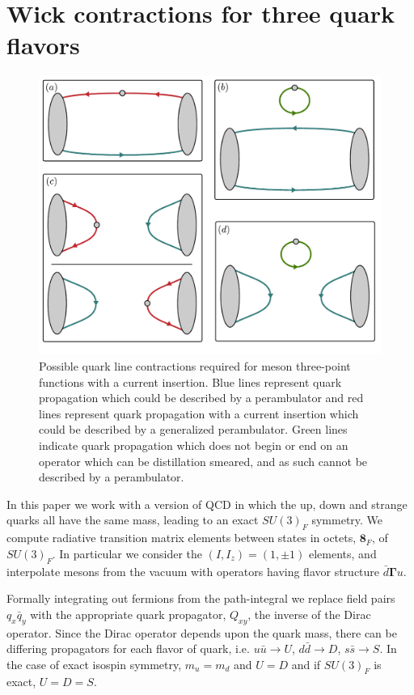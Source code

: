 \documentclass[twocolumn,amsmath,amssymb,prd,10pt,floatfix, 
superscriptaddress,nofootinbib, showpacs, preprintnumbers]{revtex4-1}
\begin{document}
\section{Wick contractions for three quark flavors\label{app::flavour}}




\begin{figure}[t]
\includegraphics[width=\linewidth]{fig23.pdf}
\caption{Possible quark line contractions required for meson three-point functions with a current insertion. Blue lines represent quark propagation which could be described by a perambulator and red lines represent quark propagation with a current insertion which could be described by a generalized perambulator. Green lines indicate quark propagation which does not begin or end on an operator which can be distillation smeared, and as such cannot be described by a perambulator. \label{wicks} }
\end{figure}



In this paper we work with a version of QCD in which the up, down and strange quarks all have the same mass, leading to an exact $SU(3)_F$ symmetry. We compute radiative transition matrix elements between states in octets, $\mathbf{8}_F$, of $SU(3)_F$. In particular we consider the $(I,I_z) = (1,\pm 1)$ elements, and interpolate mesons from the vacuum with operators having flavor structure $\bar{d} \mathbf{\Gamma} u$.

Formally integrating out fermions from the path-integral we replace field pairs $q_x\bar{q}_y$ with the appropriate quark propagator, $Q_{xy}$, the inverse of the Dirac operator. Since the Dirac operator depends upon the quark mass, there can be differing propagators for each flavor of quark, i.e. $u\bar{u} \to U$, $d\bar{d} \to D$, $s\bar{s} \to S$. In the case of exact isospin symmetry, $m_u = m_d$ and $U=D$ and if $SU(3)_F$ is exact, $U=D=S$.
\end{document}
